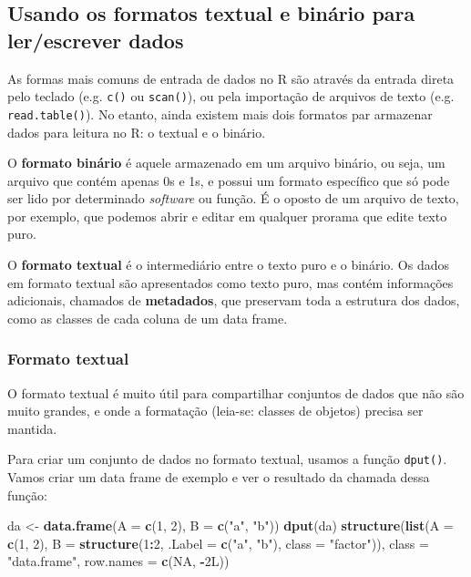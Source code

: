 \documentclass[10pt,a4paper]{book}
\newenvironment{Shaded}{\begin{snugshade}}{\end{snugshade}}
\newcommand{\KeywordTok}[1]{\textcolor[rgb]{0.13,0.29,0.53}{\textbf{#1}}}
\newcommand{\DataTypeTok}[1]{\textcolor[rgb]{0.13,0.29,0.53}{#1}}
\newcommand{\DecValTok}[1]{\textcolor[rgb]{0.00,0.00,0.81}{#1}}
\newcommand{\StringTok}[1]{\textcolor[rgb]{0.31,0.60,0.02}{#1}}
\newcommand{\OtherTok}[1]{\textcolor[rgb]{0.56,0.35,0.01}{#1}}
\newcommand{\OperatorTok}[1]{\textcolor[rgb]{0.81,0.36,0.00}{\textbf{#1}}}
\newcommand{\NormalTok}[1]{#1}
\begin{document}
\subsection{Usando os formatos textual e binário para ler/escrever
dados}\label{usando-os-formatos-textual-e-binario-para-lerescrever-dados}

As formas mais comuns de entrada de dados no R são através da entrada
direta pelo teclado (e.g. \texttt{c()} ou \texttt{scan()}), ou pela
importação de arquivos de texto (e.g. \texttt{read.table()}). No etanto,
ainda existem mais dois formatos par armazenar dados para leitura no R:
o textual e o binário.

O \textbf{formato binário} é aquele armazenado em um arquivo binário, ou
seja, um arquivo que contém apenas 0s e 1s, e possui um formato
específico que só pode ser lido por determinado \emph{software} ou
função. É o oposto de um arquivo de texto, por exemplo, que podemos
abrir e editar em qualquer prorama que edite texto puro.

O \textbf{formato textual} é o intermediário entre o texto puro e o
binário. Os dados em formato textual são apresentados como texto puro,
mas contém informações adicionais, chamados de \textbf{metadados}, que
preservam toda a estrutura dos dados, como as classes de cada coluna de
um data frame.

\subsubsection{Formato textual}\label{formato-textual}

O formato textual é muito útil para compartilhar conjuntos de dados que
não são muito grandes, e onde a formatação (leia-se: classes de objetos)
precisa ser mantida.

Para criar um conjunto de dados no formato textual, usamos a função
\texttt{dput()}. Vamos criar um data frame de exemplo e ver o resultado
da chamada dessa função:

\begin{Shaded}
\begin{Highlighting}[]
\NormalTok{da <-}\StringTok{ }\KeywordTok{data.frame}\NormalTok{(}\DataTypeTok{A =} \KeywordTok{c}\NormalTok{(}\DecValTok{1}\NormalTok{, }\DecValTok{2}\NormalTok{), }\DataTypeTok{B =} \KeywordTok{c}\NormalTok{(}\StringTok{"a"}\NormalTok{, }\StringTok{"b"}\NormalTok{))}
\KeywordTok{dput}\NormalTok{(da)}
\KeywordTok{structure}\NormalTok{(}\KeywordTok{list}\NormalTok{(}\DataTypeTok{A =} \KeywordTok{c}\NormalTok{(}\DecValTok{1}\NormalTok{, }\DecValTok{2}\NormalTok{), }\DataTypeTok{B =} \KeywordTok{structure}\NormalTok{(}\DecValTok{1}\OperatorTok{:}\DecValTok{2}\NormalTok{, }\DataTypeTok{.Label =} \KeywordTok{c}\NormalTok{(}\StringTok{"a"}\NormalTok{, }
\StringTok{"b"}\NormalTok{), }\DataTypeTok{class =} \StringTok{"factor"}\NormalTok{)), }\DataTypeTok{class =} \StringTok{"data.frame"}\NormalTok{, }\DataTypeTok{row.names =} \KeywordTok{c}\NormalTok{(}\OtherTok{NA}\NormalTok{, }
\OperatorTok{-}\NormalTok{2L))}
\end{Highlighting}
\end{Shaded}
\end{document}
